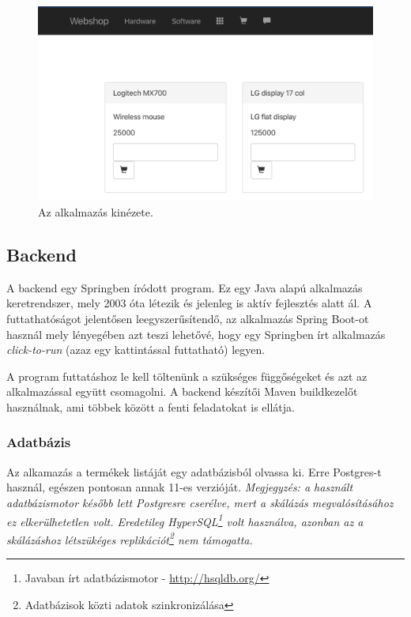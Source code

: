 \begin{figure}[ht]
\centering
\includegraphics[width=150mm, keepaspectratio]{img/frontend.png}
\caption{Az alkalmazás kinézete.}
\end{figure}
\subsection{Backend}
A backend egy Springben íródott program. Ez egy Java alapú alkalmazás keretrendszer, mely 2003 óta létezik és jelenleg is aktív fejlesztés alatt ál. A futtathatóságot jelentősen leegyszerűsítendő, az alkalmazás Spring Boot-ot használ mely lényegében azt teszi lehetővé, hogy egy Springben írt alkalmazás \textit{click-to-run} (azaz egy kattintással futtatható) legyen.\cite{SpringBoot}

A program futtatáshoz le kell töltenünk a szükséges függőségeket és azt az alkalmazással együtt csomagolni. A backend készítői Maven buildkezelőt használnak, ami többek között a fenti feladatokat is ellátja.
\subsubsection{Adatbázis}
Az alkamazás a termékek listáját egy adatbázisból olvassa ki. Erre Postgres-t használ, egészen pontosan annak 11-es verzióját.
\vskip 0.1in
\textit{Megjegyzés: a használt adatbázismotor később lett Postgresre cserélve, mert a skálázás megvalósításához ez elkerülhetetlen volt. Eredetileg HyperSQL\footnote{Javaban írt adatbázismotor - \url{http://hsqldb.org/}} volt használva, azonban az a skálázáshoz létszükéges replikációt\footnote{Adatbázisok közti adatok szinkronizálása} nem támogatta.\cite{HSQL}}

